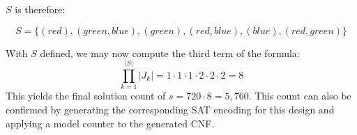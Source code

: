 $S$ is therefore:

\[
S = \{(red), (green, blue), (green), (red, blue), (blue), (red, green)\}
\]

With $S$ defined, we may now compute the third term of the formula:
\[
    \prod_{k=1}^{|S|} |J_k| = 1 \cdot 1 \cdot 1 \cdot 2 \cdot 2 \cdot 2 = 8
\]
This yields the final solution count of $s = 720 \cdot 8 = 5,760$. This count can also be confirmed by generating the corresponding SAT encoding for this design and applying a model counter to the generated CNF.


